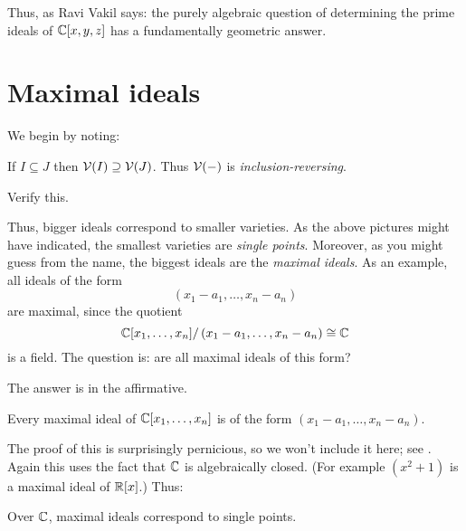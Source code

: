 Thus, as Ravi Vakil \cite{ref:vakil} says:
the purely algebraic question 
of determining the prime ideals of $\mathbb C[x,y,z]$
has a fundamentally geometric answer.

\section{Maximal ideals}
We begin by noting:
\begin{proposition}
	If $I \subseteq J$ then $\mathcal V(I) \supseteq \mathcal V(J)$.
	Thus $\mathcal V(-)$ is \emph{inclusion-reversing}.
\end{proposition}
\begin{ques}
	Verify this.
\end{ques}
Thus, bigger ideals correspond to smaller varieties.
As the above pictures might have indicated,
the smallest varieties are \emph{single points}.
Moreover, as you might guess from the name,
the biggest ideals are the \emph{maximal ideals}.
As an example, all ideals of the form
\[ \left( x_1-a_1, \dots, x_n-a_n \right) \]
are maximal, since the quotient
\[ \mathbb C[x_1, \dots, x_n] / \left( x_1-a_1, \dots, x_n-a_n \right) \cong \mathbb C \]
is a field.
The question is: are all maximal ideals of this form?

The answer is in the affirmative.
\begin{theorem}
	Every maximal ideal of $\mathbb C[x_1, \dots, x_n]$
	is of the form $(x_1-a_1, \dots, x_n-a_n)$.
\end{theorem}
The proof of this is surprisingly pernicious,
so we won't include it here; see \cite[\S7.4.3]{ref:vakil}.
Again this uses the fact that $\mathbb C$ is algebraically closed.
(For example $(x^2+1)$ is a maximal ideal of $\mathbb R[x]$.)
Thus:
\begin{moral}
	Over $\mathbb C$, maximal ideals correspond to single points.
\end{moral}

